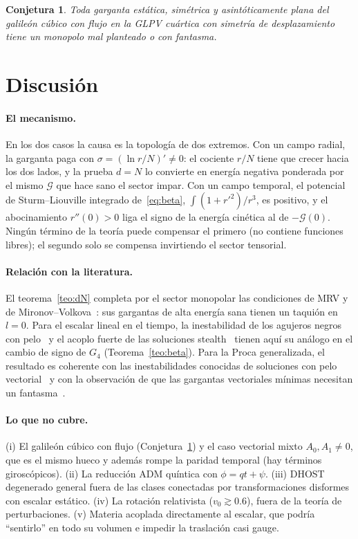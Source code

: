 \documentclass[11pt,a4paper]{article}
\newtheorem{conjetura}[teorema]{Conjetura}
\theoremstyle{remark}
\newcommand{\G}{\mathcal G}
\begin{document}
\begin{conjetura}\label{conj:cubico}
Toda garganta estática, simétrica y asintóticamente plana del galileón cúbico con flujo en la GLPV cuártica con simetría de desplazamiento tiene un monopolo mal planteado o con fantasma.
\end{conjetura}

\section{Discusión}\label{sec:discusion}

\paragraph{El mecanismo.} En los dos casos la causa es la topología de dos extremos. Con un campo radial, la garganta paga con $\sigma=(\ln r/N)'\neq0$: el cociente $r/N$ tiene que crecer hacia los dos lados, y la prueba $d=N$ lo convierte en energía negativa ponderada por el mismo $\G$ que hace sano el sector impar. Con un campo temporal, el potencial de Sturm--Liouville integrado de~\eqref{eq:beta}, $\int(1+r'^2)/r^3$, es positivo, y el abocinamiento $r''(0)>0$ liga el signo de la energía cinética al de $-\G(0)$. Ningún término de la teoría puede compensar el primero (no contiene funciones libres); el segundo solo se compensa invirtiendo el sector tensorial.

\paragraph{Relación con la literatura.} El teorema~\ref{teo:dN} completa por el sector monopolar las condiciones de MRV y de Mironov--Volkova~\cite{MRV3,MironovVolkova}: sus gargantas de alta energía sana tienen un taquión en $l=0$. Para el escalar lineal en el tiempo, la inestabilidad de los agujeros negros con pelo~\cite{OgawaKobayashiSuyama} y el acoplo fuerte de las soluciones stealth~\cite{deRhamZhang} tienen aquí su análogo en el cambio de signo de $G_4$ (Teorema~\ref{teo:beta}). Para la Proca generalizada, el resultado es coherente con las inestabilidades conocidas de soluciones con pelo vectorial~\cite{HKMT,KaseOdd,DeFeliceCubic,GarciaSaenz} y con la observación de que las gargantas vectoriales mínimas necesitan un fantasma~\cite{Ganiyeva}.

\paragraph{Lo que no cubre.} (i) El galileón cúbico con flujo (Conjetura~\ref{conj:cubico}) y el caso vectorial mixto $A_0,A_1\neq0$, que es el mismo hueco y además rompe la paridad temporal (hay términos giroscópicos). (ii) La reducción ADM quíntica con $\phi=qt+\psi$. (iii) DHOST degenerado general fuera de las clases conectadas por transformaciones disformes con escalar estático. (iv) La rotación relativista ($v_0\gtrsim0.6$), fuera de la teoría de perturbaciones. (v) Materia acoplada directamente al escalar, que podría ``sentirlo'' en todo su volumen e impedir la traslación casi gauge.
\end{document}
